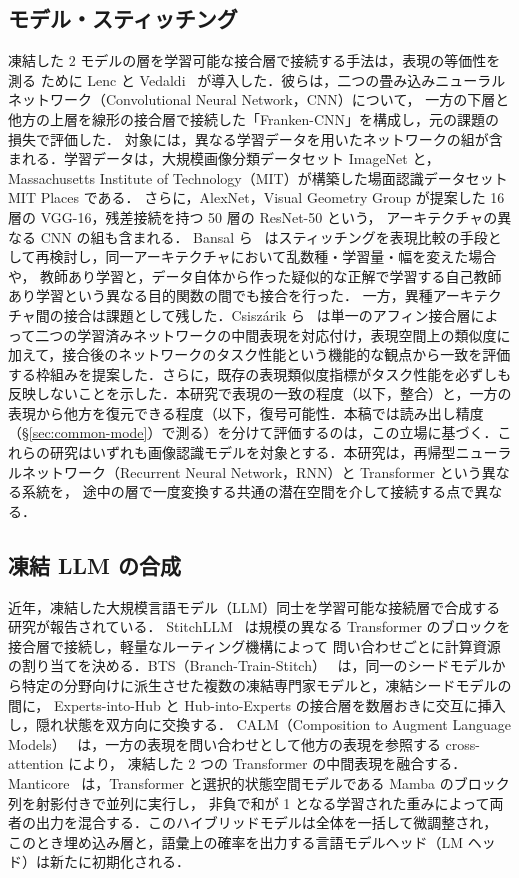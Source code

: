 \documentclass[techrep,noauthor]{ipsj}
\newcommand{\rev}[1]{{\color{blue}#1}}
\newcommand{\revr}[1]{{\color{red}#1}}
\newcommand{\revp}[1]{{\color{violet}#1}}
\begin{document}
\subsection{モデル・スティッチング}
凍結した $2$ モデルの層を学習可能な接合層で接続する手法は，表現の等価性を測る
ために Lenc と Vedaldi~\cite{10.1007/s11263-018-1098-y} が導入した．\rev{彼らは，二つの畳み込みニューラルネットワーク（Convolutional Neural Network，CNN）について，
一方の下層と他方の上層を線形の接合層で接続した「Franken-CNN」を構成し，元の課題の損失で評価した．
対象には，異なる学習データを用いたネットワークの組が含まれる．学習データは，大規模画像分類データセット ImageNet と，
Massachusetts Institute of Technology（MIT）が構築した場面認識データセット MIT Places である．
さらに，AlexNet，Visual Geometry Group が提案した 16 層の VGG-16，残差接続を持つ 50 層の ResNet-50 という，
アーキテクチャの異なる CNN の組も含まれる．}
Bansal ら~\cite{3540261.3540279} はスティッチングを表現比較の手段として再検討し，同一アーキテクチャにおいて乱数種・学習量・幅を変えた場合や，
教師あり学習と\rev{，データ自体から作った疑似的な正解で学習する}自己教師あり学習という異なる目的関数の間でも接合を行った．
一方，異種アーキテクチャ間の接合は課題として残した．Csisz\'arik ら~\cite{NEURIPS2021_2cb274e6} は単一のアフィン接合層によって二つの学習済みネットワークの中間表現を対応付け，表現空間上の類似度に加えて，接合後のネットワークのタスク性能という機能的な観点から一致を評価する枠組みを提案した．さらに，既存の表現類似度指標がタスク性能を必ずしも反映しないことを示した．本研究で\rev{表現の一致の程度（以下，整合）と，一方の表現から他方を復元できる程度（\revp{以下，復号可能性．本稿では読み出し精度\rev{（\S\ref{sec:common-mode}）}で測る}）}を分けて評価するのは，この立場に基づく．これらの研究はいずれも画像認識モデルを対象とする．本研究は，\rev{再帰型ニューラルネットワーク（Recurrent Neural Network，RNN）}と Transformer という異なる系統を，
\revr{途中の層で一度変換する共通の潜在空間を介して}接続する点で異なる．
\subsection{凍結 LLM の合成}
近年，凍結した大規模言語モデル（LLM）同士を学習可能な接続層で合成する研究が報告されている．
StitchLLM~\cite{hu-etal-2025-stitchllm} は規模の異なる Transformer のブロックを接合層で接続し，軽量なルーティング機構によって
問い合わせごとに計算資源の割り当てを決める．\rev{BTS（Branch-Train-Stitch）~\cite{zhang-etal-2025-bts} は，同一のシードモデルから特定の分野向けに派生させた複数の凍結専門家モデルと，凍結シードモデルの間に，}
Experts-into-Hub と Hub-into-Experts の接合層を数層おきに交互に挿入し，隠れ状態を双方向に交換する．
\rev{CALM（Composition to Augment Language Models）~\cite{bansal2024llm} は，一方の表現を問い合わせとして他方の表現を参照する cross-attention により，
凍結した 2 つの Transformer の中間表現を融合する．}
\rev{Manticore~\cite{roberts2025pretrained} は，Transformer と選択的状態空間モデルである Mamba のブロック列を射影付きで並列に実行し，
非負で和が 1 となる学習された重みによって両者の出力を混合する．このハイブリッドモデルは全体を一括して微調整され，
このとき埋め込み層と，語彙上の確率を出力する言語モデルヘッド（LM ヘッド）は新たに初期化される．}
\end{document}
